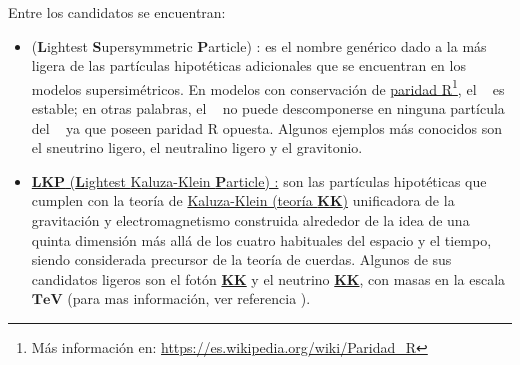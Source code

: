 \begin{itemize}
Entre los candidatos se encuentran:
\begin{itemize}
\item 	\LSP (\textbf{L}ightest \textbf{S}upersymmetric \textbf{P}article)%
: es el nombre genérico dado a la más ligera de las partículas hipotéticas adicionales que se encuentran en los modelos supersimétricos. En modelos con conservación de \href{https://es.wikipedia.org/wiki/Paridad\_R}{paridad R}\footnote{{Más información en: \href{https://es.wikipedia.org/wiki/Paridad\_R}{https://es.wikipedia.org/wiki/Paridad\_R}}}, el \LSP ~ es estable; en otras palabras, el \LSP ~ no puede descomponerse en ninguna partícula del \ME~ ya que poseen paridad R opuesta. Algunos ejemplos más conocidos son el sneutrino ligero, el neutralino ligero y el gravitonio.


\item \href{https://en.wikipedia.org/wiki/Kaluza\%E2\%80\%93Klein_theory}{\textbf{LKP} (\textbf{L}ightest {K}aluza-Klein \textbf{P}article) :} son las partículas hipotéticas que cumplen con la teoría de \href{https://en.wikipedia.org/wiki/Kaluza\%E2\%80\%93Klein_theory}{Kaluza-Klein (teoría \textbf{KK})} unificadora de la gravitación y electromagnetismo construida alrededor de la idea de una quinta dimensión más allá de los cuatro habituales del espacio y el tiempo, siendo considerada precursor de la teoría de cuerdas. Algunos de sus candidatos ligeros son el fotón \href{https://en.wikipedia.org/wiki/Kaluza\%E2\%80\%93Klein_theory}{\textbf{KK}} y el neutrino \href{https://en.wikipedia.org/wiki/Kaluza\%E2\%80\%93Klein_theory}{\textbf{KK}}, con masas en la escala $\mathbf{TeV}$ (para mas información, ver referencia \cite{servant_is_2003}).


\end{itemize}



\end{itemize}
